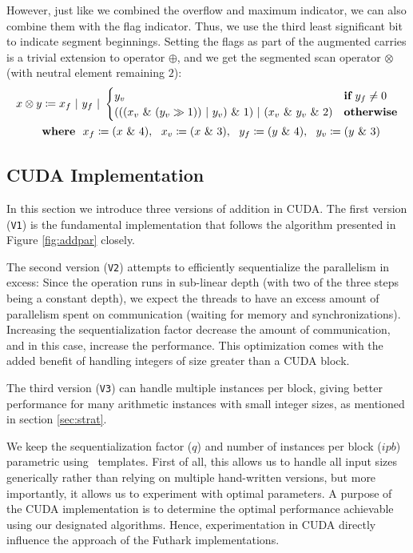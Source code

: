 However, just like we combined the overflow and maximum indicator, we can also
combine them with the flag indicator. Thus, we use the third least significant
bit to indicate segment beginnings. Setting the flags as part of the augmented
carries is a trivial extension to operator $\oplus$, and we get the segmented scan
operator $\otimes$ (with neutral element remaining $2$):
\begin{align}
  \label{eq:segscanop}
  x \otimes y &\coloneq x_f~|~y_f~|~\begin{cases} y_v & \textbf{if}~y_f \neq 0 \\ (((x_v~\&~(y_v \gg 1))~|~y_v)~\&~1)~|~(x_v~\&~y_v~\&~2) & \textbf{otherwise}\end{cases}\\
  & \textbf{where}~~x_f\coloneq (x~\&~4),~~x_v\coloneq (x~\&~3),~~y_f\coloneq (y~\&~4),~~y_v\coloneq (y~\&~3)\notag
\end{align}

\subsection{CUDA Implementation}
\label{subsec:addcud}

In this section we introduce three versions of addition in CUDA. The first
version (\texttt{V1}) is the fundamental implementation that follows the
algorithm presented in Figure \ref{fig:addpar} closely.

The second version (\texttt{V2}) attempts to efficiently sequentialize the
parallelism in excess: Since the operation runs in sub-linear depth (with two of
the three steps being a constant depth), we expect the threads to have an excess
amount of parallelism spent on communication (waiting for memory and
synchronizations). Increasing the sequentialization factor decrease the amount
of communication, and in this case, increase the performance. This optimization
comes with the added benefit of handling integers of size greater than a CUDA
block.

The third version (\texttt{V3}) can handle multiple instances per block, giving
better performance for many arithmetic instances with small integer sizes, as
mentioned in section \ref{sec:strat}.

We keep the sequentialization factor ($q$) and number of instances per block
($\mathit{ipb}$) parametric using \cpp\ templates. First of all, this allows us
to handle all input sizes generically rather than relying on multiple
hand-written versions, but more importantly, it allows us to experiment with
optimal parameters. A purpose of the CUDA implementation is to determine the
optimal performance achievable using our designated algorithms. Hence,
experimentation in CUDA directly influence the approach of the Futhark
implementations.


